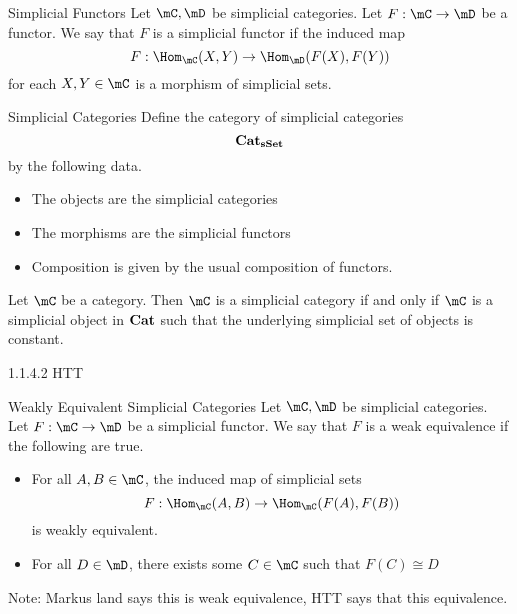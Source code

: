 \documentclass[a4paper]{article}
\begin{document}
\begin{defn}{Simplicial Functors}{} Let $\mC,\mD$ be simplicial categories. Let $F:\mC\to\mD$ be a functor. We say that $F$ is a simplicial functor if the induced map $$F:\Hom_\mC(X,Y)\to\Hom_\mD(F(X),F(Y))$$ for each $X,Y\in\mC$ is a morphism of simplicial sets. 
\end{defn}

\begin{defn}{Simplicial Categories}{} Define the category of simplicial categories $$\bold{Cat}_\bold{sSet}$$ by the following data. 
\begin{itemize}
\item The objects are the simplicial categories
\item The morphisms are the simplicial functors
\item Composition is given by the usual composition of functors. 
\end{itemize}
\end{defn}

\begin{prp}{}{} Let $\mC$ be a category. Then $\mC$ is a simplicial category if and only if $\mC$ is a simplicial object in $\bold{Cat}$ such that the underlying simplicial set of objects is constant. 
\end{prp}

1.1.4.2 HTT

\begin{defn}{Weakly Equivalent Simplicial Categories}{} Let $\mC,\mD$ be simplicial categories. Let $F:\mC\to\mD$ be a simplicial functor. We say that $F$ is a weak equivalence if the following are true. 
\begin{itemize}
\item For all $A,B\in\mC$, the induced map of simplicial sets $$F:\Hom_\mC(A,B)\to\Hom_\mC(F(A),F(B))$$ is weakly equivalent. 
\item For all $D\in\mD$, there exists some $C\in\mC$ such that $F(C)\cong D$
\end{itemize}
\end{defn}

Note: Markus land says this is weak equivalence, HTT says that this equivalence. 
\end{document}
